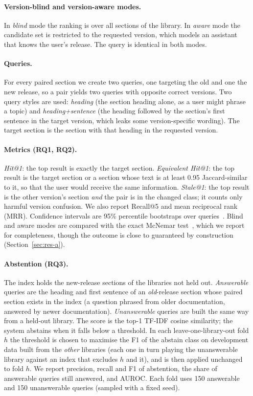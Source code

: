 \documentclass[11pt,a4paper]{article}
\begin{document}
\paragraph{Version-blind and version-aware modes.}
In \emph{blind} mode the ranking is over all sections of the library. In \emph{aware} mode the candidate set is restricted to the requested version,
which models an assistant that knows the user's release. The query is identical in both modes.

\paragraph{Queries.}
For every paired section we create two queries, one targeting the old and one the new release, so a pair yields two queries with opposite
correct versions. Two query styles are used: \emph{heading} (the section heading alone, as a user might phrase a topic) and \emph{heading+sentence} (the heading
followed by the section's first sentence in the target version, which leaks some version-specific wording). The target section is the section with that heading in the requested version.

\paragraph{Metrics (RQ1, RQ2).}
\emph{Hit@1}: the top result is exactly the target section. \emph{Equivalent Hit@1}: the top result is the target section or a section whose text is
at least 0.95 Jaccard-similar to it, so that the user would receive the same information. \emph{Stale@1}: the top result is the other version's section \emph{and} the pair is in
the changed class; it counts only harmful version confusion. We also report Recall@5 and mean reciprocal rank (MRR). Confidence intervals are 95\% percentile
bootstraps over queries~\cite{efron1979}. Blind and aware modes are compared with the exact McNemar test~\cite{mcnemar1947}, which we report for completeness, though
the outcome is close to guaranteed by construction (Section~\ref{sec:res-a}).

\paragraph{Abstention (RQ3).}
The index holds the new-release sections of the libraries not held out. \emph{Answerable} queries are the heading and first sentence of an \emph{old}-release section whose paired section exists in the index
(a question phrased from older documentation, answered by newer documentation). \emph{Unanswerable} queries are built the same way from a held-out library. The score is the top-1 TF-IDF cosine
similarity; the system abstains when it falls below a threshold. In each leave-one-library-out fold $h$ the threshold is chosen to maximise the F1 of the abstain class
on development data built from the \emph{other} libraries (each one in turn playing the unanswerable library against an index that excludes $h$ and it), and is then applied unchanged to fold $h$. We
report precision, recall and F1 of abstention, the share of answerable queries still answered, and AUROC. Each fold uses 150 answerable and 150 unanswerable queries (sampled with a fixed seed).
\end{document}

